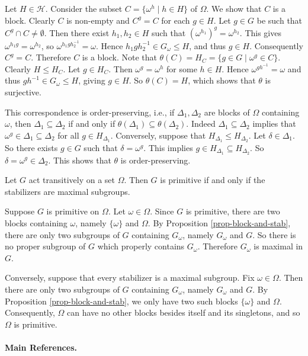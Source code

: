 \begin{sketch}
	Let $H\in\mathcal{H}$. Consider the subset $C = \{\omega^h \mid h \in H\}$ of $\Omega$. We show that $C$ is a block. Clearly $C$ is non-empty and $C^g = C$ for each $g\in H$. Let $g \in G$ be such that $C^g \cap C\neq \emptyset$. Then there exist $h_1, h_2 \in H$ such that $(\omega^{h_1})^g = \omega^{h_2}$. This gives $\omega^{h_1g} = \omega^{h_2}$, so $\omega^{h_1gh_2^{-1}} = \omega$. Hence $h_1gh_2^{-1} \in G_\omega \le H$, and thus $g \in H$. Consequently $C^g = C$. Therefore $C$ is a block. Note that $\theta(C) = H_C = \{g \in G \mid \omega^g \in C\}$. Clearly $H \le H_C$. Let $g \in H_C$. Then $\omega^g = \omega^h$ for some $h \in H$. Hence $\omega^{gh^{-1}} = \omega$ and thus $gh^{-1} \in G_\omega \le H$, giving $g \in H$. So $\theta(C) = H$, which shows that $\theta$ is surjective.
\end{sketch}
\begin{remark}
	This correspondence is order-preserving, i.e., if $\Delta_1,\Delta_2$ are blocks of $\Omega$ containing $\omega$, then $\Delta_1\subseteq \Delta_2$ if and only if $\theta(\Delta_1)\subseteq \theta(\Delta_2)$. Indeed $\Delta_1\subseteq \Delta_2$ implies that $\omega^g \in \Delta_1\subseteq \Delta_2$ for all $g\in H_{\Delta_1}$. Conversely, suppose that $H_{\Delta_1}\leq H_{\Delta_2}$. Let $\delta\in \Delta_1$. So there exists $g\in G$ such that $\delta = \omega^g$. This implies $g\in H_{\Delta_1}\subseteq H_{\Delta_2}$. So $\delta = \omega^g \in \Delta_2$. This shows that $\theta$ is order-preserving.
\end{remark}

\begin{corollary}
	Let $G$ act transitively on a set $\Omega$. Then $G$ is primitive if and only
	if the stabilizers are maximal subgroups.
\end{corollary}
\begin{sketch}
	Suppose $G$ is primitive on $\Omega$. Let $\omega \in \Omega$.  Since $G$ is primitive, there are  two  blocks containing $\omega$, namely $\{\omega\}$ and $\Omega$.  By Proposition \ref{prop-block-and-stab}, there are only two subgroups of $G$ containing $G_\omega$, namely $G_\omega$ and $G$. So there is no proper subgroup of $G$ which properly contains $G_\omega$. Therefore $G_\omega$ is maximal in $G$.
	
	Conversely, suppose that every stabilizer is a maximal subgroup. Fix $\omega\in \Omega$. Then there are only two subgroups of $G$ containing $G_\omega$, namely $G_\omega$ and $G$. By Proposition \ref{prop-block-and-stab}, we only have two such blocks $\{\omega\}$ and $\Omega$.  Consequently, $\Omega$ can have no other blocks besides itself and its singletons, and so $\Omega$ is primitive.
\end{sketch}

\paragraph{Main References.} \cite{Praeger2018,Dixon1996,Cameron1999}